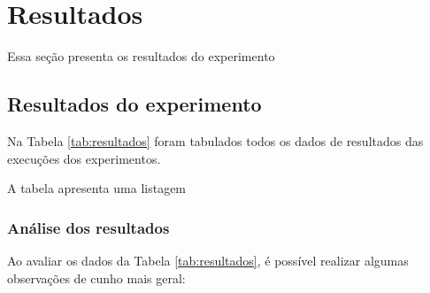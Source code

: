 \chapter{Resultados}\label{cap:resultados}

Essa seção presenta os resultados do experimento \lipsum[11]

\section{Resultados do experimento}

\lipsum[12-13]

Na Tabela \ref{tab:resultados} foram tabulados todos os dados de resultados das execuções dos experimentos. 

A tabela apresenta uma listagem \lipsum[14]

\lipsum[15-17]

\subsection{Análise dos resultados}
Ao avaliar os dados da Tabela \ref{tab:resultados}, é possível realizar algumas observações de cunho mais geral:

\lipsum[18]


